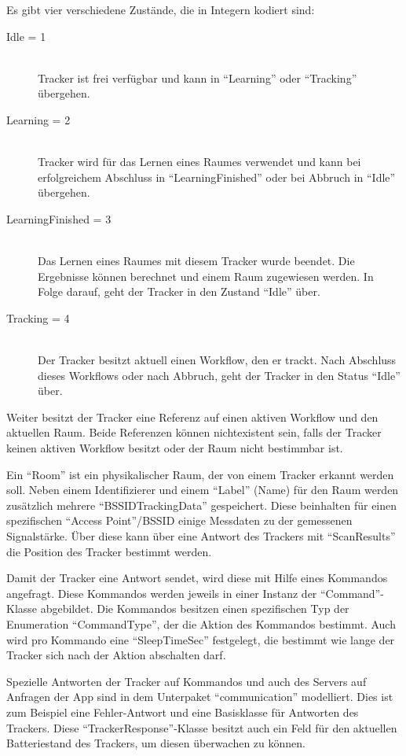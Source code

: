 Es gibt vier verschiedene Zustände, die in Integern kodiert sind:
\begin{description}
	\item[Idle = 1] \hfill \\
		Tracker ist frei verfügbar und kann in \enquote{Learning} oder \enquote{Tracking} übergehen.
	\item[Learning = 2] \hfill \\
		Tracker wird für das Lernen eines Raumes verwendet und kann bei erfolgreichem Abschluss in \enquote{LearningFinished} oder bei Abbruch in \enquote{Idle} übergehen.
	\item[LearningFinished = 3] \hfill \\
		Das Lernen eines Raumes mit diesem Tracker wurde beendet. Die Ergebnisse können berechnet und einem Raum zugewiesen werden. In Folge darauf, geht der Tracker in den Zustand \enquote{Idle} über.
	\item[Tracking = 4] \hfill \\
		Der Tracker besitzt aktuell einen Workflow, den er trackt. Nach Abschluss dieses Workflows oder nach Abbruch, geht der Tracker in den Status \enquote{Idle} über.
\end{description}

Weiter besitzt der Tracker eine Referenz auf einen aktiven Workflow und den aktuellen Raum.
Beide Referenzen können nichtexistent sein, falls der Tracker keinen aktiven Workflow besitzt oder der Raum nicht bestimmbar ist.

Ein \enquote{Room} ist ein physikalischer Raum, der von einem Tracker erkannt werden soll.
Neben einem Identifizierer und einem \enquote{Label} (Name) für den Raum werden zusätzlich mehrere \enquote{BSSIDTrackingData} gespeichert.
Diese beinhalten für einen spezifischen \enquote{Access Point}/\gls{BSSID} einige Messdaten zu der gemessenen Signalstärke.
Über diese kann über eine Antwort des Trackers mit \enquote{ScanResults} die Position des Tracker bestimmt werden.

Damit der Tracker eine Antwort sendet, wird diese mit Hilfe eines Kommandos angefragt.
Diese Kommandos werden jeweils in einer Instanz der \enquote{Command}-Klasse abgebildet.
Die Kommandos besitzen einen spezifischen Typ der Enumeration \enquote{CommandType}, der die Aktion des Kommandos bestimmt.
Auch wird pro Kommando eine \enquote{SleepTimeSec} festgelegt, die bestimmt wie lange der Tracker sich nach der Aktion abschalten darf.

Spezielle Antworten der Tracker auf Kommandos und auch des Servers auf Anfragen der App sind in dem Unterpaket \enquote{communication} modelliert.
Dies ist zum Beispiel eine Fehler-Antwort und eine Basisklasse für Antworten des Trackers.
Diese \enquote{TrackerResponse}-Klasse besitzt auch ein Feld für den aktuellen Batteriestand des Trackers, um diesen überwachen zu können.

